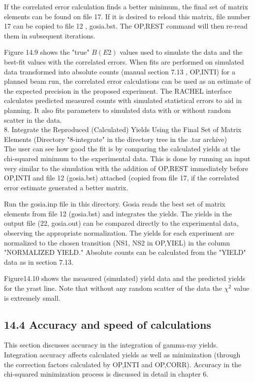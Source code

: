 \documentclass[10pt]{article}
\begin{document}
If the correlated error calculation finds a better minimum, the final set of matrix elements can be found on file 17. If it is desired to reload this matrix, file number 17 can be copied to file 12 , gosia.bst. The OP,REST command will then re-read them in subsequent iterations.

Figure 14.9 shows the "true" $B(E 2)$ values used to simulate the data and the best-fit values with the correlated errors. When fits are performed on simulated data transformed into absolute counts (manual section 7.13 , OP,INTI) for a planned beam run, the correlated error calculations can be used as an estimate of the expected precision in the proposed experiment. The RACHEL interface calculates predicted measured counts with simulated statistical errors to aid in planning. It also fits parameters to simulated data with or without random scatter in the data.\\
8. Integrate the Reproduced (Calculated) Yields Using the Final Set of Matrix Elements (Directory "8-integrate" in the directory tree in the .tar archive)\\
The user can see how good the fit is by comparing the calculated yields at the chi-squared minimum to the experimental data. This is done by running an input very similar to the simulation with the addition of OP,REST immediately before OP,INTI and file 12 (gosia.bst) attached (copied from file 17, if the correlated error estimate generated a better matrix.

Run the gosia.inp file in this directory. Gosia reads the best set of matrix elements from file 12 (gosia.bst) and integrates the yields. The yields in the output file (22, gosia.out) can be compared directly to the experimental data, observing the appropriate normalization. The yields for each experiment are normalized to the chosen transition (NS1, NS2 in OP,YIEL) in the column "NORMALIZED YIELD." Absolute counts can be calculated from the "YIELD" data as in section 7.13.

Figure14.10 shows the measured (simulated) yield data and the predicted yields for the yrast line. Note that without any random scatter of the data the $\chi^{2}$ value is extremely small.

\subsection*{14.4 Accuracy and speed of calculations}
This section discusses accuracy in the integration of gamma-ray yields. Integration accuracy affects calculated yields as well as minimization (through the correction factors calculated by OP,INTI and OP,CORR). Accuracy in the chi-squared minimization process is discussed in detail in chapter 6.
\end{document}
